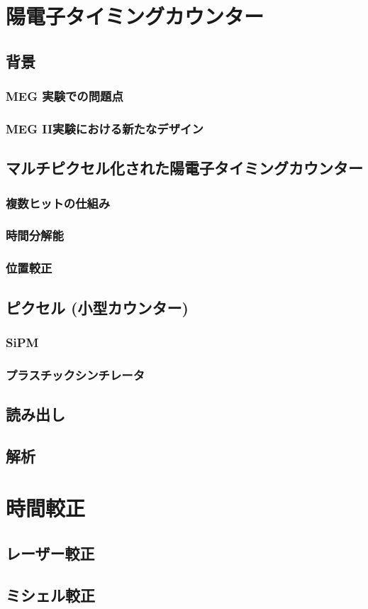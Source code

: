 \documentclass[Yonemoto_master.tex]{subfiles}
\begin{document}
\chapter{陽電子タイミングカウンター}
\section{背景}
\subsection{MEG 実験での問題点}
\subsection{MEG II実験における新たなデザイン}
\section{マルチピクセル化された陽電子タイミングカウンター}
\subsection{複数ヒットの仕組み}
\subsection{時間分解能}
\subsection{位置較正}
\section{ピクセル (小型カウンター)}
\subsection{SiPM}
\subsection{プラスチックシンチレータ}
\section{読み出し}
\section{解析}

\chapter{時間較正}
\section{レーザー較正}
\section{ミシェル較正}
\end{document}

